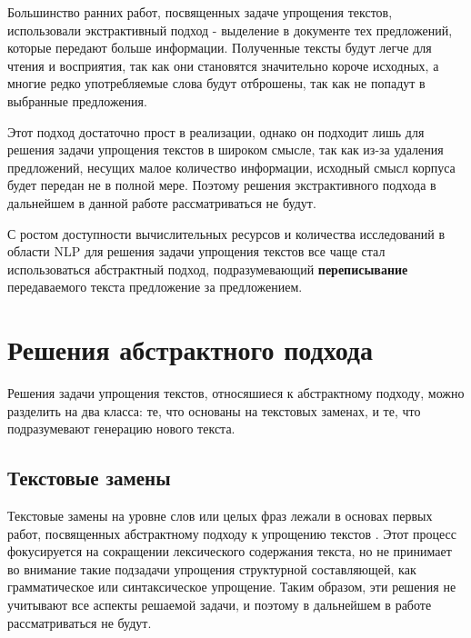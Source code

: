 Большинство ранних работ, посвященных задаче упрощения текстов, использовали экстрактивный подход - выделение в документе тех предложений, которые передают больше информации. Полученные тексты будут легче для чтения и восприятия, так как они становятся значительно короче исходных, а многие редко употребляемые слова будут отброшены, так как не попадут в выбранные предложения. 

Этот подход достаточно прост в реализации, однако он подходит лишь для решения задачи упрощения текстов в широком смысле, так как из-за удаления предложений, несущих малое количество информации, исходный смысл корпуса будет передан не в полной мере. Поэтому решения экстрактивного подхода в дальнейшем в данной работе рассматриваться не будут.

С ростом доступности вычислительных ресурсов и количества исследований в области NLP для решения задачи упрощения текстов все чаще стал использоваться абстрактный подход, подразумевающий \textbf{переписывание} передаваемого текста предложение за предложением\cite{see_get_2017}. 

\section{Решения абстрактного подхода}

Решения задачи упрощения текстов, относяшиеся к абстрактному подходу, можно разделить на два класса: те, что основаны на текстовых заменах, и те, что подразумевают генерацию нового текста.

\subsection{Текстовые замены}

Текстовые замены на уровне слов или целых фраз лежали в основах первых работ, посвященных абстрактному подходу к упрощению текстов \cite{paetzold_survey_2017}. Этот процесс фокусируется на сокращении лексического содержания текста, но не принимает во внимание такие подзадачи упрощения структурной составляющей, как грамматическое или синтаксическое упрощение\cite{shardlow_survey_2014}. Таким образом, эти решения не учитывают все аспекты решаемой задачи, и поэтому в дальнейшем в работе рассматриваться не будут.

